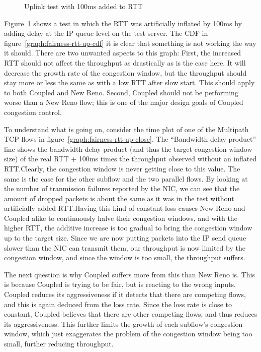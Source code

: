 \begin{figure}[h]
 \centering
 \subfloat[][CDF] {\
   \scalebox{0.55}{}\label{graph:fairness-rtt-up-cdf}
 }
 \subfloat[][Multipath TCP time plot] {\
   \scalebox{0.55}{}\label{graph:fairness-rtt-up-close}
 }
 \caption{Uplink test with 100ms added to RTT}\label{graph:fairness-rtt-up}
\end{figure}

Figure~\ref{graph:fairness-rtt-up} shows a test in which the RTT was
artificially inflated by 100ms by adding delay at the IP queue level on the test
server. The CDF in figure~\ref{graph:fairness-rtt-up-cdf} it is clear that
something is not working the way it should. There are two unwanted aspects to
this graph: First, the increased RTT should not affect the throughput as
drastically as is the case here. It will decrease the growth rate of the
congestion window, but the throughput should stay more or less the same as with
a low RTT after slow start. This should apply to both Coupled and New Reno.
Second, Coupled should not be performing worse than a New Reno flow; this is one
of the major design goals of Coupled congestion control.

To understand what is going on, consider the time plot of one of the Multipath
TCP flows in figure~\ref{graph:fairness-rtt-up-close}. The ``Bandwidth delay
product'' line shows the bandwidth delay product (and thus the target congestion
window size) of the real RTT + 100ms times the throughput observed without an
inflated RTT.\@ Clearly, the congestion window is never getting close to this
value. The same is the case for the other subflow and the two parallel flows. By
looking at the number of tranmission failures reported by the NIC, we can see
that the amount of dropped packets is about the same as it was in the test
without artificially added RTT.\@ Having this kind of constant loss causes New
Reno and Coupled alike to continuously halve their congestion windows, and with
the higher RTT, the additive increase is too gradual to bring the congestion
window up to the target size. Since we are now putting packets into the IP send
queue slower than the NIC can transmit them, our throughput is now limited by
the congestion window, and since the window is too small, the throughput
suffers.

The next question is why Coupled suffers more from this than New Reno is. This
is because Coupled is trying to be fair, but is reacting to the wrong inputs.
Coupled reduces its aggressiveness if it detects that there are competing flows,
and this is again deduced from the loss rate. Since the loss rate is close to
constant, Coupled believes that there are other competing flows, and thus
reduces its aggressiveness. This further limits the growth of each subflow's
congestion window, which just exaggerates the problem of the congestion window
being too small, further reducing throughput.

